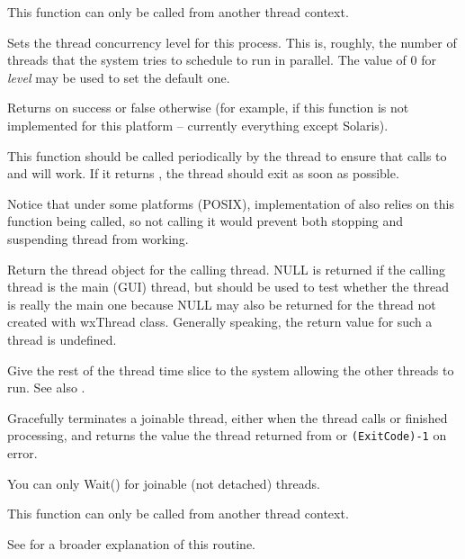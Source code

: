 This function can only be called from another thread context.


\label{wxthreadsetconcurrency}


Sets the thread concurrency level for this process. This is, roughly, the
number of threads that the system tries to schedule to run in parallel.
The value of $0$ for {\it level} may be used to set the default one.

Returns \true on success or false otherwise (for example, if this function is
not implemented for this platform -- currently everything except Solaris).


\label{wxthreadtestdestroy}


This function should be called periodically by the thread to ensure that calls
to  and  will
work. If it returns \true, the thread should exit as soon as possible.

Notice that under some platforms (POSIX), implementation of 
 also relies on this function being called, so
not calling it would prevent both stopping and suspending thread from working.


\label{wxthreadthis}


Return the thread object for the calling thread. NULL is returned if the calling thread
is the main (GUI) thread, but  should be used to test
whether the thread is really the main one because NULL may also be returned for the thread
not created with wxThread class. Generally speaking, the return value for such a thread
is undefined.


\label{wxthreadyield}


Give the rest of the thread time slice to the system allowing the other threads to run.
See also .


\label{wxthreadwait}


Gracefully terminates a joinable thread, either when the thread calls 
 or finished processing, and 
returns the value the thread returned from 
 or {\tt (ExitCode)-1} on error. 

You can only Wait() for joinable (not detached) threads.

This function can only be called from another thread context.

See  for a broader explanation of this routine.
